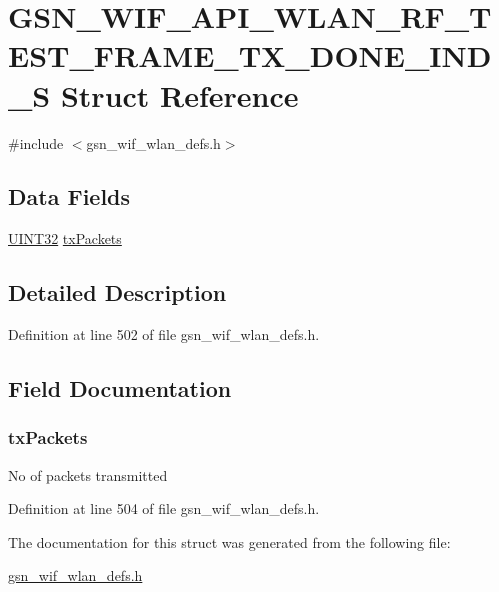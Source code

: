 \hypertarget{a00305}{
\section{GSN\_\-WIF\_\-API\_\-WLAN\_\-RF\_\-TEST\_\-FRAME\_\-TX\_\-DONE\_\-IND\_\-S Struct Reference}
\label{a00305}
}


{\ttfamily \#include $<$gsn\_\-wif\_\-wlan\_\-defs.h$>$}

\subsection*{Data Fields}
\begin{DoxyCompactItemize}
\item 
\hyperlink{a00660_gae1e6edbbc26d6fbc71a90190d0266018}{UINT32} \hyperlink{a00305_a8656ce85365a1e5366e37a558f14a056}{txPackets}
\end{DoxyCompactItemize}


\subsection{Detailed Description}


Definition at line 502 of file gsn\_\-wif\_\-wlan\_\-defs.h.



\subsection{Field Documentation}
\hypertarget{a00305_a8656ce85365a1e5366e37a558f14a056}{
\subsubsection[{txPackets}]{ {\bf txPackets}}}
\label{a00305_a8656ce85365a1e5366e37a558f14a056}
No of packets transmitted 

Definition at line 504 of file gsn\_\-wif\_\-wlan\_\-defs.h.



The documentation for this struct was generated from the following file:\begin{DoxyCompactItemize}
\item 
\hyperlink{a00613}{gsn\_\-wif\_\-wlan\_\-defs.h}\end{DoxyCompactItemize}
